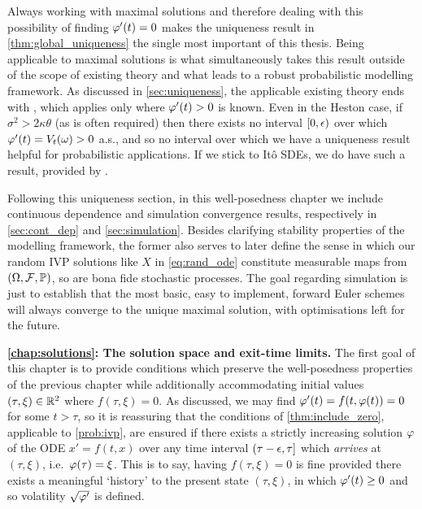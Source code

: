 Always working with maximal solutions and therefore dealing with this possibility of finding $\varphi'(t)=0$ makes the uniqueness result in \autoref{thm:global_uniqueness} the single most important of this thesis. Being applicable to maximal solutions is what simultaneously takes this result outside of the scope of existing theory and what leads to a robust probabilistic modelling framework. As discussed in \autoref{sec:uniqueness}, the applicable existing theory ends with \cite{wend_1969}, which applies only where $\varphi'(t)>0$ is known. Even in the Heston case, if $\sigma^2>2\kappa\theta$ (as is often required) then there exists no interval $[0,\epsilon)$ over which $\varphi'(t)=V_t(\omega)>0$ a.s., and so no interval over which we have a uniqueness result helpful for probabilistic applications. If we stick to It\^o SDEs, we do have such a result, provided by \cite{yamada_1971}.

Following this uniqueness section, in this well-posedness chapter we include continuous dependence and simulation convergence results, respectively in \autoref{sec:cont_dep} and \autoref{sec:simulation}. Besides clarifying stability properties of the modelling framework, the former also serves to later define the sense in which our random IVP solutions like $X$ in \autoref{eq:rand_ode} constitute measurable maps from $(\Omega,\mathcal{F},\mathbb{P})$, so are bona fide stochastic processes. The goal regarding simulation is just to establish that the most basic, easy to implement, forward Euler schemes will always converge to the unique maximal solution, with optimisations left for the future.

\vspace{3mm}\textbf{\autoref{chap:solutions}: The solution space and exit-time limits.} The first goal of this chapter is to provide conditions which preserve the well-posedness properties of the previous chapter while additionally accommodating initial values $(\tau,\xi)\in\mathbb{R}^2$ where $f(\tau,\xi)=0$. As discussed, we may find $\varphi'(t)=f(t,\varphi(t))=0$ for some $t>\tau$, so it is reassuring that the conditions of \autoref{thm:include_zero}, applicable to \autoref{prob:ivp}, are ensured if there exists a strictly increasing solution $\varphi$ of the ODE $x'=f(t,x)$ over any time interval $(\tau-\epsilon,\tau]$ which \emph{arrives} at $(\tau,\xi)$, i.e.~$\varphi(\tau)=\xi$. This is to say, having $f(\tau,\xi)=0$ is fine provided there exists a meaningful `history' to the present state $(\tau,\xi)$, in which $\varphi'(t)\ge0$ and so volatility $\sqrt{\varphi'}$ is defined.

